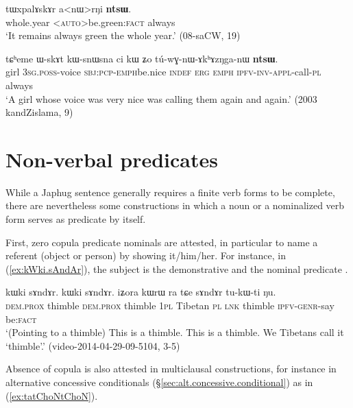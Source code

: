 \begin{exe}
\ex \label{ex:anWrNi.ntsW}
\gll tɯxpalɤskɤr a<nɯ>rŋi \textbf{ntsɯ}. \\
whole.year <\textsc{auto}>be.green:\textsc{fact} always \\
\glt `It remains always green the whole year.' (08-saCW, 19)
\end{exe}

\begin{exe}
\ex \label{ex:postV.ntsW}
\gll  tɕʰeme ɯ-skɤt kɯ-snɯ\redp{}sna ci kɯ ʑo tú-wɣ-nɯ-ɤkʰɤzŋga-nɯ \textbf{ntsɯ}. \\
girl \textsc{3sg}.\textsc{poss}-voice \textsc{sbj}:\textsc{pcp}-\textsc{emph}\redp{}be.nice \textsc{indef} \textsc{erg} \textsc{emph} \textsc{ipfv}-\textsc{inv}-\textsc{appl}-call-\textsc{pl} always \\
\glt `A girl whose voice was very nice was calling them again and again.' (2003 kandZislama, 9)
\end{exe}

 
\section{Non-verbal predicates} \label{sec:non.verbal.predicates}
While a Japhug sentence generally requires a finite verb forms to be complete, there are nevertheless some constructions in which a noun or a nominalized verb form serves as predicate by itself.

First, zero copula predicate nominals are attested, in particular to name a referent (object or person) by showing it/him/her. For instance, in (\ref{ex:kWki.sAndAr}), the subject is the demonstrative  and the nominal predicate . 
 
\begin{exe}
\ex \label{ex:kWki.sAndAr}
\gll kɯki sɤndɤr. kɯki sɤndɤr. iʑora kɯrɯ ra tɕe sɤndɤr tu-kɯ-ti ŋu. \\
\textsc{dem}.\textsc{prox} thimble  \textsc{dem}.\textsc{prox} thimble \textsc{1pl} Tibetan \textsc{pl} \textsc{lnk} thimble \textsc{ipfv}-\textsc{genr}-say be:\textsc{fact} \\
\glt `(Pointing to a thimble) This is a thimble. This is a thimble. We Tibetans call it `thimble'.' (video-2014-04-29-09-5104, 3-5)
\end{exe}

Absence of copula is also attested in multiclausal constructions, for instance in alternative concessive conditionals (§\ref{sec:alt.concessive.conditional}) as in (\ref{ex:tatChoNtChoN}).

